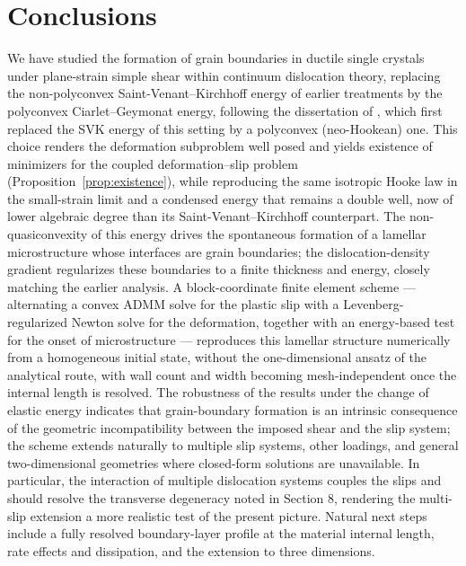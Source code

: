 \documentclass[12pt]{article}
\theoremstyle{plain}
\theoremstyle{definition}
\begin{document}
\section{Conclusions}\label{sec:conclusions}

We have studied the formation of grain boundaries in ductile single crystals under plane-strain simple shear within continuum dislocation theory, replacing the non-polyconvex Saint-Venant--Kirchhoff energy of earlier treatments \citep{koster2015aformation,koster2015bformation} by the polyconvex Ciarlet–Geymonat energy, following the dissertation of \citet{koster2018modeling}, which first replaced the SVK energy of this setting by a polyconvex (neo-Hookean) one. This choice renders the deformation subproblem well posed and yields existence of minimizers for the coupled deformation--slip problem (Proposition~\ref{prop:existence}), while reproducing the same isotropic Hooke law in the small-strain limit and a condensed energy that remains a double well, now of lower algebraic degree than its Saint-Venant--Kirchhoff counterpart. The non-quasiconvexity of this energy drives the spontaneous formation of a lamellar microstructure whose interfaces are grain boundaries; the dislocation-density gradient regularizes these boundaries to a finite thickness and energy, closely matching the earlier analysis. A block-coordinate finite element scheme --- alternating a convex ADMM solve for the plastic slip with a Levenberg-regularized Newton solve for the deformation, together with an energy-based test for the onset of microstructure --- reproduces this lamellar structure numerically from a homogeneous initial state, without the one-dimensional ansatz of the analytical route, with wall count and width becoming mesh-independent once the internal length is resolved. The robustness of the results under the change of elastic energy indicates that grain-boundary formation is an intrinsic consequence of the geometric incompatibility between the imposed shear and the slip system; the scheme extends naturally to multiple slip systems, other loadings, and general two-dimensional geometries where closed-form solutions are unavailable. In particular, the interaction of multiple dislocation systems \citep{le2008plane,le2009plane} couples the slips and should resolve the transverse degeneracy noted in Section 8, rendering the multi-slip extension a more realistic test of the present picture. Natural next steps include a fully resolved boundary-layer profile at the material internal length, rate effects and dissipation, and the extension to three dimensions.
\end{document}
